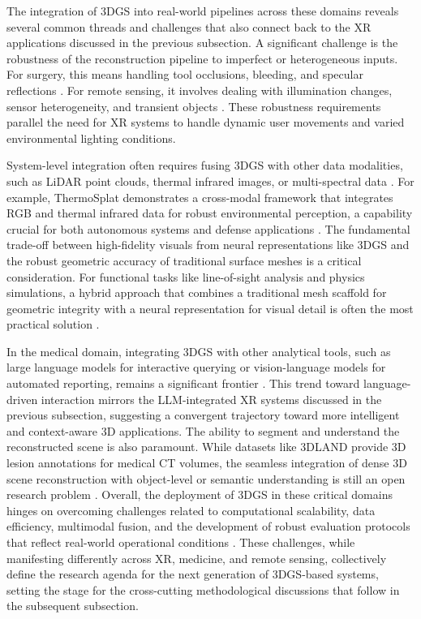\documentclass[11pt]{article}
\begin{document}
The integration of 3DGS into real-world pipelines across these domains reveals several common threads and challenges that also connect back to the XR applications discussed in the previous subsection. A significant challenge is the robustness of the reconstruction pipeline to imperfect or heterogeneous inputs. For surgery, this means handling tool occlusions, bleeding, and specular reflections \cite{ref705}. For remote sensing, it involves dealing with illumination changes, sensor heterogeneity, and transient objects \cite{ref699,ref700}. These robustness requirements parallel the need for XR systems to handle dynamic user movements and varied environmental lighting conditions.

System-level integration often requires fusing 3DGS with other data modalities, such as LiDAR point clouds, thermal infrared images, or multi-spectral data \cite{ref93,ref623,ref706}. For example, ThermoSplat demonstrates a cross-modal framework that integrates RGB and thermal infrared data for robust environmental perception, a capability crucial for both autonomous systems and defense applications \cite{ref623}. The fundamental trade-off between high-fidelity visuals from neural representations like 3DGS and the robust geometric accuracy of traditional surface meshes is a critical consideration. For functional tasks like line-of-sight analysis and physics simulations, a hybrid approach that combines a traditional mesh scaffold for geometric integrity with a neural representation for visual detail is often the most practical solution \cite{ref93}.

In the medical domain, integrating 3DGS with other analytical tools, such as large language models for interactive querying or vision-language models for automated reporting, remains a significant frontier \cite{ref707,ref708}. This trend toward language-driven interaction mirrors the LLM-integrated XR systems discussed in the previous subsection, suggesting a convergent trajectory toward more intelligent and context-aware 3D applications. The ability to segment and understand the reconstructed scene is also paramount. While datasets like 3DLAND provide 3D lesion annotations for medical CT volumes, the seamless integration of dense 3D scene reconstruction with object-level or semantic understanding is still an open research problem \cite{ref709}. Overall, the deployment of 3DGS in these critical domains hinges on overcoming challenges related to computational scalability, data efficiency, multimodal fusion, and the development of robust evaluation protocols that reflect real-world operational conditions \cite{ref37}. These challenges, while manifesting differently across XR, medicine, and remote sensing, collectively define the research agenda for the next generation of 3DGS-based systems, setting the stage for the cross-cutting methodological discussions that follow in the subsequent subsection.
\end{document}
